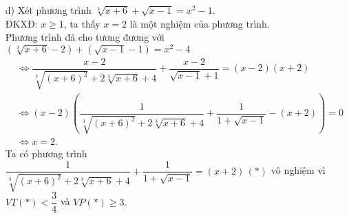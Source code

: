 \begin{bt}
{\begin{itemize}
        	ĐKXĐ  $x \leq 1.$\\
        	Đặt $\heva{&a= \sqrt[3]{x+8}\\&b=\sqrt{1-x}\, b\geq 0},$ ta có $\heva{&a+b=3\\&a^3+b^2=9} \Rightarrow a(a+3)(a-2)=0$.\\
        	Từ đó suy ra phương trình có $3$ nghiệm là $x=-8; x=-35; x=0.$
        	\item [d)] Xét phương trình $\sqrt[3]{x+6}+\sqrt{x-1}=x^2-1.$\\
        	ĐKXĐ: $x\geq 1$, ta thấy $x=2$ là một nghiệm của phương trình.\\
        	Phương trình đã cho tương đương với $\left( \sqrt[3]{x+6} -2\right) +\left( \sqrt{x-1}-1\right)=x^2-4$
        	\begin{align*}
        	&\Leftrightarrow \dfrac{x-2}{\sqrt[3]{(x+6)^2}+2 \sqrt[3]{x+6}+4} +\dfrac{x-2}{\sqrt{x-1}+1}=(x-2)(x+2)\\&\Leftrightarrow (x-2)\left( \dfrac{1}{\sqrt[3]{(x+6)^2}+2 \sqrt[3]{x+6}+4} +\dfrac{1}{1+\sqrt{x-1}} -(x+2) \right)=0\\&\Leftrightarrow x=2.
        	\end{align*}
        	Ta có phương trình $\dfrac{1}{\sqrt[3]{(x+6)^2}+2 \sqrt[3]{x+6}+4} +\dfrac{1}{1+\sqrt{x-1}} =(x+2) \, (*)$ vô nghiệm vì $VT(*) < \dfrac{3}{4}$ và $VP(*)\geq 3.$
        \end{itemize}  
    }
\end{bt}
